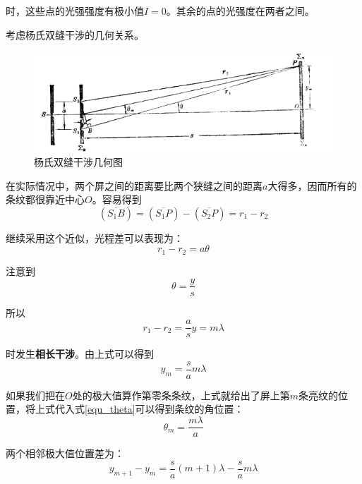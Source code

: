 \documentclass[UTF8]{ctexart}
\begin{document}
\noindent 时，这些点的光强强度有极小值$ I=0 $。其余的点的光强度在两者之间。

考虑杨氏双缝干涉的几何关系。
\begin{figure}[h]
	\centering
	\includegraphics[width=12cm]{Yang1.png}
	\caption{杨氏双缝干涉几何图}
	\label{figure_Yang1}
\end{figure}

	在实际情况中，两个屏之间的距离要比两个狭缝之间的距离$ a $大得多，因而所有的条纹都很靠近中心$ O $。容易得到
	\begin{equation}
	\left(\overline{S_{1} B}\right)=\left(\overline{S_{1} P}\right)-\left(\overline{S_{2} P}\right)=r_{1}-r_{2}
	\end{equation}
	
	继续采用这个近似，光程差可以表现为：
	\begin{equation}
	r_{1}-r_{2}=a \theta
	\end{equation}
	
\noindent 注意到
	\begin{equation}
		\theta=\frac{y}{s}\label{equ_theta}
	\end{equation}
	
\noindent 所以
	\begin{equation}
		r_{1}-r_{2}=\frac{a}{s} y =m \lambda
	\end{equation}
	
\noindent 时发生\textbf{相长干涉}。由上式可以得到
\begin{equation}
	y_{m}=\frac{s}{a} m \lambda
\end{equation}

\noindent 如果我们把在$ O $处的极大值算作第零条条纹，上式就给出了屏上第$ m $条亮纹的位置，将上式代入式\ref{equ_theta}可以得到条纹的角位置：
\begin{equation}
	\theta_{m}=\frac{m \lambda}{a}
\end{equation}

	两个相邻极大值位置差为：
	\begin{equation}
	y_{m+1}-y_{m}=\frac{s}{a}(m+1) \lambda-\frac{s}{a} m \lambda
	\end{equation}
	
\end{document}
